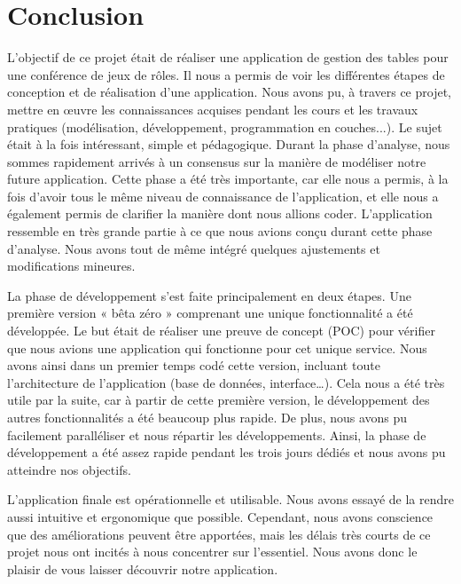 \documentclass[11pt]{article}
\begin{document}
\bigbreak



\newpage
\section*{Conclusion}

L'objectif de ce projet était de réaliser une application de gestion des tables pour une conférence de jeux de rôles. Il nous a permis de voir les différentes étapes de conception et de réalisation d'une application. Nous avons pu, à travers ce projet, mettre en œuvre les connaissances acquises pendant les cours et les travaux pratiques (modélisation, développement, programmation en couches...). Le sujet était à la fois intéressant, simple et pédagogique. Durant la phase d'analyse, nous sommes rapidement arrivés à un consensus sur la manière de modéliser notre future application. Cette phase a été très importante, car elle nous a permis, à la fois d'avoir tous le même niveau de connaissance de l'application, et elle nous a également permis de clarifier la manière dont nous allions coder. L’application ressemble en très grande partie à ce que nous avions conçu durant cette phase d’analyse. Nous avons tout de même intégré quelques ajustements et modifications mineures.

\bigbreak

La phase de développement s’est faite principalement en deux étapes. Une première version « bêta zéro » comprenant une unique fonctionnalité a été développée. Le but était de réaliser une preuve de concept (POC) pour vérifier que nous avions une application qui fonctionne pour cet unique service. Nous avons ainsi dans un premier temps codé cette version, incluant toute l’architecture de l’application (base de données, interface…). Cela nous a été très utile par la suite, car à partir de cette première version, le développement des autres fonctionnalités a été beaucoup plus rapide. De plus, nous avons pu facilement paralléliser et nous répartir les développements. Ainsi, la phase de développement a été assez rapide pendant les trois jours dédiés et nous avons pu atteindre nos objectifs.

\bigbreak

L'application finale est opérationnelle et utilisable. Nous avons essayé de la rendre aussi intuitive et ergonomique que possible. Cependant, nous avons conscience que des améliorations peuvent être apportées, mais les délais très courts de ce projet nous ont incités à nous concentrer sur l'essentiel. Nous avons donc le plaisir de vous laisser découvrir notre application.
\end{document}
